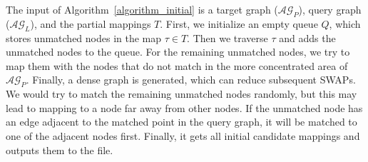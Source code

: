 \documentclass[runningheads]{llncs}
\begin{document}
	The input of Algorithm~\ref{algorithm_initial} is a target graph ($\mathcal{AG}_{P}$), query graph ($\mathcal{AG}_{L}$), and the partial mappings $T$. First, we initialize an empty queue $Q$,  which stores unmatched nodes in the map $\tau \in T$.
	Then we traverse $\tau$ and adds the unmatched nodes to the queue.  For the remaining unmatched nodes, we try to map them with the nodes that do not match in the more concentrated area of $\mathcal{AG}_{P}$. Finally, a dense graph is generated, which can reduce subsequent SWAPs. We would try to match the remaining unmatched nodes randomly, but this may lead to mapping to a node far away from other nodes. If the unmatched node has an edge adjacent to the matched point in the query graph, it will be matched to one of the adjacent nodes first.  Finally, it gets all initial candidate mappings and outputs them to the file.
\end{document}
